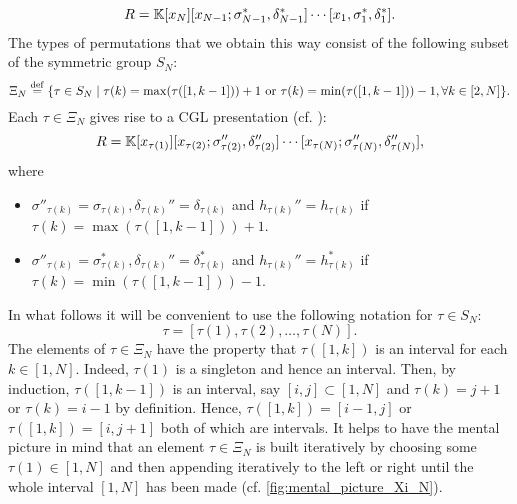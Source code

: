 \begin{equation*}
	R = \mathbb{K}[x_N][x_{N-1}; \sigma_{N-1}^*, \delta_{N-1}^*]\cdots [x_1, \sigma_1^*, \delta_1^*].
\end{equation*}
%
The types of permutations that we obtain this way consist of the following subset of
the symmetric group $S_N$:
\begin{equation*}
	\Xi_N \overset{\mathrm{def}}{=} \{\tau \in S_N \mid \tau(k) = \max (\tau ([1, k-1])) + 1 \text{ or } \tau(k) = \min (\tau ([1, k-1])) - 1, \forall k \in [2, N]\}.
\end{equation*}
%
%
Each $\tau \in \Xi_N$ gives rise to a CGL presentation (cf. \cite[Proposition
	3.14]{GoodearlYakimov2017QCA}):
\begin{equation}\label{eq:cgl_presentation_tau}
	R = \mathbb{K}[x_{\tau(1)}][x_{\tau(2)}; \sigma_{\tau(2)}'', \delta_{\tau(2)}''] \cdots [x_{\tau(N)}; \sigma_{\tau(N)}'', \delta_{\tau(N)}''],
\end{equation}
%
where
\begin{itemize}
	\item $\sigma''_{\tau(k)} = \sigma_{\tau(k)}, \delta_{\tau(k)}'' = \delta_{\tau(k)}$
	      and $h_{\tau(k)}'' = h_{\tau(k)}$ if $\tau(k) = \max(\tau([1,k-1])) + 1$.
	\item
	      $\sigma''_{\tau(k)} = \sigma^*_{\tau(k)}, \delta_{\tau(k)}'' = \delta^*_{\tau(k)}$ and
	      $h_{\tau(k)}'' = h_{\tau(k)}^*$ if $\tau(k) = \min(\tau([1,k-1])) - 1$.
\end{itemize}

In what follows it will be convenient to use the following notation for $\tau \in S_N$:
\begin{equation*}
	\tau = [\tau(1), \tau(2), \dots, \tau(N)].
\end{equation*}
%
The elements of $\tau \in \Xi_N$ have the property that $\tau([1, k])$ is an interval
for each $k \in [1, N]$. Indeed, $\tau(1)$ is a singleton and hence an interval. Then,
by induction, $\tau([1, k-1])$ is an interval, say $[i, j] \subset [1, N]$ and $\tau(k)
	= j + 1$ or $\tau(k) = i - 1$ by definition. Hence, $\tau([1, k]) = [i-1, j]$ or
$\tau([1, k]) = [i, j+1]$ both of which are intervals. It helps to have the mental
picture in mind that an element $\tau \in \Xi_N$ is built iteratively by choosing some
$\tau(1) \in [1, N]$ and then appending iteratively to the left or right until the
whole interval $[1, N]$ has been made (cf. \cref{fig:mental_picture_Xi_N}).

